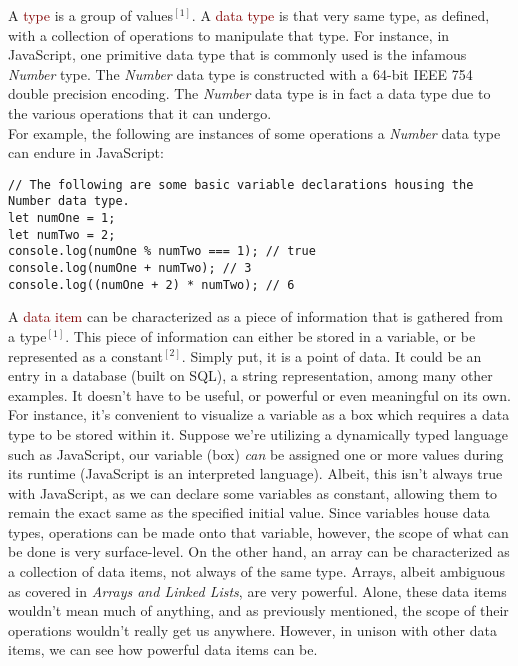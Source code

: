 A \textcolor{Maroon}{type} is a group of values$^{[1]}$. A  \textcolor{Maroon}{data type} is that very same type, as defined, with a collection of operations to manipulate that type. For instance, in JavaScript, one primitive data type that is commonly used is the infamous \textit{Number} type. The \textit{Number} data type is constructed with a 64-bit IEEE 754 double precision encoding. The \textit{Number} data type is in fact a data type due to the various operations that it can undergo.
\\

For example, the following are instances of some operations a \textit{Number} data type can endure in JavaScript:

\begin{verbatim}
// The following are some basic variable declarations housing the Number data type.
let numOne = 1;
let numTwo = 2;
console.log(numOne % numTwo === 1); // true
console.log(numOne + numTwo); // 3
console.log((numOne + 2) * numTwo); // 6
\end{verbatim}

A \textcolor{Maroon}{data item} can be characterized as a piece of information that is gathered from a type$^{[1]}$. This piece of information can either be stored in a variable, or be represented as a constant$^{[2]}$. Simply put, it is a point of data. It could be an entry in a database (built on SQL), a string representation, among many other examples. It doesn't have to be useful, or powerful or even meaningful on its own. For instance, it's convenient to visualize a variable as a box which requires a data type to be stored within it. Suppose we're utilizing a dynamically typed language such as JavaScript, our variable (box) \textit{can} be assigned one or more values during its runtime (JavaScript is an interpreted language). Albeit, this isn't always true with JavaScript, as we can declare some variables as constant, allowing them to remain the exact same as the specified initial value. Since variables house data types, operations can be made onto that variable, however, the scope of what can be done is very surface-level. On the other hand, an array can be characterized as a collection of data items, not always of the same type. Arrays, albeit ambiguous as covered in \textit{Arrays and Linked Lists}, are very powerful. Alone, these data items wouldn't mean much of anything, and as previously mentioned, the scope of their operations wouldn't really get us anywhere. However, in unison with other data items, we can see how powerful data items can be.
\\

